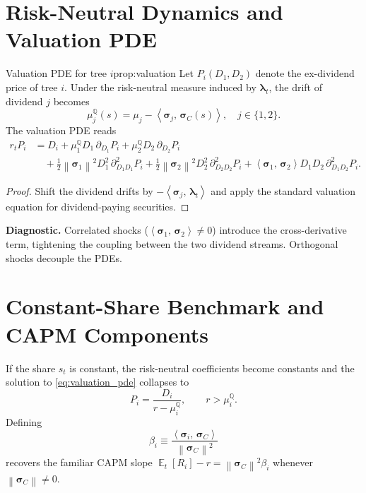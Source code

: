 ﻿\documentclass[11pt,letterpaper,oneside]{article}
\numberwithin{equation}{section}
\DeclareMathOperator{\E}{\mathbb{E}}
\newcommand{\1}{\mathbf{1}}
\newcommand{\norm}[1]{\left\lVert #1\right\rVert}
\newcommand{\ip}[2]{\left\langle #1,\,#2\right\rangle}
\begin{document}
\section{Risk-Neutral Dynamics and Valuation PDE}\label{sec:pde}
\begin{proposition}{Valuation PDE for tree $i$}{prop:valuation}
Let $P_i(D_1,D_2)$ denote the ex-dividend price of tree $i$. Under the risk-neutral measure induced by $\bm{\lambda}_t$, the drift of dividend $j$ becomes
\begin{equation}\label{eq:rn_drift}
  \mu_j^{\mathbb{Q}}(s) = \mu_j-\ip{\bm{\sigma}_j}{\bm{\sigma}_C(s)}, \quad j\in\{1,2\}.
\end{equation}
The valuation PDE reads
\begin{align}\label{eq:valuation_pde}
  r_t P_i &= D_i
   + \mu_1^{\mathbb{Q}} D_1\,\partial_{D_1} P_i
   + \mu_2^{\mathbb{Q}} D_2\,\partial_{D_2} P_i \\
  &\quad + \tfrac12 \norm{\bm{\sigma}_1}^2 D_1^2\,\partial^2_{D_1 D_1} P_i
   + \tfrac12 \norm{\bm{\sigma}_2}^2 D_2^2\,\partial^2_{D_2 D_2} P_i
   + \ip{\bm{\sigma}_1}{\bm{\sigma}_2} D_1 D_2\,\partial^2_{D_1 D_2} P_i.
\end{align}
\end{proposition}
\begin{proof}
Shift the dividend drifts by $-\ip{\bm{\sigma}_j}{\bm{\lambda}_t}$ and apply the standard valuation equation for dividend-paying securities.
\end{proof}

\begin{tcolorbox}[mathstyle]
\textbf{Diagnostic.} Correlated shocks ($\ip{\bm{\sigma}_1}{\bm{\sigma}_2}\neq0$) introduce the cross-derivative term, tightening the coupling between the two dividend streams. Orthogonal shocks decouple the PDEs.
\end{tcolorbox}

\section{Constant-Share Benchmark and CAPM Components}\label{sec:benchmark}
If the share $s_t$ is constant, the risk-neutral coefficients become constants and the solution to \eqref{eq:valuation_pde} collapses to
\begin{equation}\label{eq:const_share_solution}
  P_i = \frac{D_i}{r-\mu_i^{\mathbb{Q}}}, \qquad r>\mu_i^{\mathbb{Q}}.
\end{equation}
Defining
\begin{equation}\label{eq:beta}
  \beta_i \equiv \frac{\ip{\bm{\sigma}_i}{\bm{\sigma}_C}}{\norm{\bm{\sigma}_C}^2}
\end{equation}
recovers the familiar CAPM slope $\E_t[R_i]-r=\norm{\bm{\sigma}_C}^2\beta_i$ whenever $\norm{\bm{\sigma}_C}\neq0$.
\end{document}
